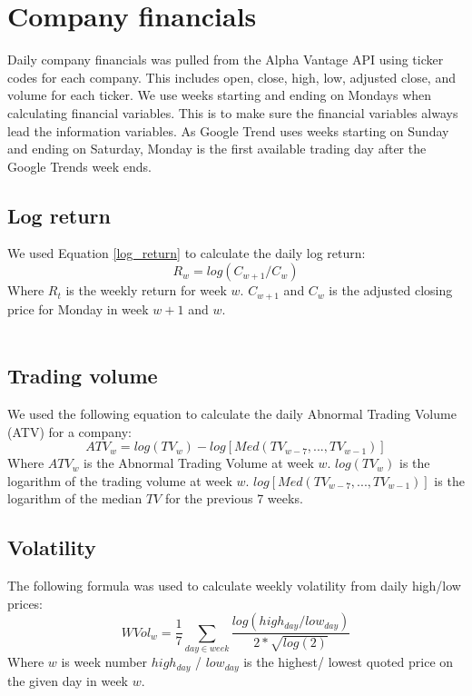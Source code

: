 \section{Company financials}
Daily company financials was pulled from the Alpha Vantage API using ticker codes for each company. This includes open, close, high, low, adjusted close, and volume for each ticker. We use weeks starting and ending on Mondays when calculating financial variables. This is to make sure the financial variables always lead the information variables. As Google Trend uses weeks starting on Sunday and ending on Saturday, Monday is the first available trading day after the Google Trends week ends. 
\subsection*{Log return}
We used Equation \eqref{log_return} to calculate the daily log return:
\begin{equation}
   \label{log_return} 
   R_w = log (C_{w+1}/C_{w}) 
\end{equation}
Where $R_t$ is the weekly return for week $w$. $C_{w+1}$ and  $C_{w}$ is the adjusted closing price for Monday in week $w+1$ and $w$. 
\\\\
\subsection*{Trading volume}
We used the following equation to calculate the daily Abnormal Trading Volume (ATV) for a company: 
\begin{equation}
   \label{abnormal_volume} 
   ATV_{w} = log(TV_{w}) - log[Med(TV_{w-7},...,TV_{w-1})] 
\end{equation}
   Where $ATV_w$ is the Abnormal Trading Volume at week $w$. $log(TV_{w})$ is the logarithm of the trading volume at week $w$. $log[Med(TV_{w-7},...,TV_{w-1})]$ is the logarithm of the median $TV$ for the previous 7 weeks.
\subsection*{Volatility}
The following formula was used to calculate weekly volatility from daily high/low prices:
\begin{equation}
   \label{w_volatility} 
   WVol_{w} = \frac{1}{7} \sum_{day\in week} \frac{log(high_{day}/low_{day})}{2*\sqrt{log(2)}} 
\end{equation}
Where $w$ is week number $high_{day}$ / $low_{day}$ is the highest/ lowest quoted price on the given day in week $w$.

